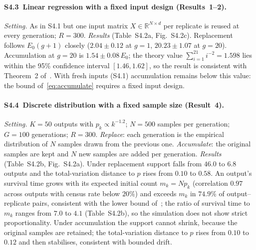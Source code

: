 \paragraph{S4.3~Linear regression with a fixed input design (Results~1--2).}
\emph{Setting.} As in S4.1 but one input matrix $X\in\mathbb{R}^{N\times d}$ per
replicate is reused at every generation; $R=300$.
\emph{Results} (Table~S4.2a, Fig.~S4.2c). Replacement follows $E_0(g+1)$ closely
($2.04\pm0.12$ at $g=1$, $20.23\pm1.07$ at $g=20$). Accumulation at $g=20$ is
$1.54\pm0.08\,E_0$; the theory value $\sum_{i=1}^{21}i^{-2}=1.598$ lies within the
95\% confidence interval $[1.46, 1.62]$, so the result is consistent with
Theorem~2 of~\cite{gerstgrasser2024colm}. With fresh inputs (S4.1)
accumulation remains below this value: the bound of~\eqref{eq:accumulate} requires
a fixed input design.

\paragraph{S4.4~Discrete distribution with a fixed sample size (Result~4).}
\emph{Setting.} $K=50$ outputs with $p_k\propto k^{-1.2}$; $N=500$ samples per
generation; $G=100$ generations; $R=300$. \emph{Replace}: each generation is the
empirical distribution of $N$ samples drawn from the previous one. \emph{Accumulate}:
the original samples are kept and $N$ new samples are added per generation.
\emph{Results} (Table~S4.2b, Fig.~S4.2a). Under replacement support falls from
$46.0$ to $6.8$ outputs and the total-variation distance to $p$ rises from $0.10$
to $0.58$. An output's survival time grows with its expected initial count
$m_k = Np_k$ (correlation $0.97$ across outputs with census rate below $20\%$) and
exceeds $m_k$ in $74.9\%$ of output--replicate pairs, consistent with the lower
bound of~\cite{suresh2025rate}; the ratio of survival time to $m_k$ ranges from
$7.0$ to $4.1$ (Table~S4.2b), so the simulation does not show strict
proportionality.
Under accumulation the support cannot shrink, because the original samples are
retained; the total-variation distance to $p$ rises from $0.10$ to $0.12$ and
then stabilises, consistent with bounded drift.


